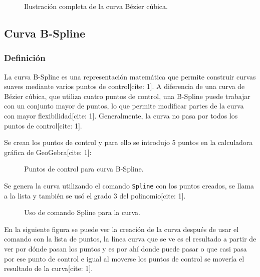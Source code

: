\documentclass[12pt,letterpaper]{article}
\begin{document}
\begin{figure}[H]
    \centering
    \caption{Ilustración completa de la curva Bézier cúbica.}
    \label{fig:curva_bezier_completa}
\end{figure}

\subsection{Curva B-Spline}

\subsubsection{Definición}
La curva B-Spline es una representación matemática que permite construir curvas suaves mediante varios puntos de control[cite: 1]. A diferencia de una curva de Bézier cúbica, que utiliza cuatro puntos de control, una B-Spline puede trabajar con un conjunto mayor de puntos, lo que permite modificar partes de la curva con mayor flexibilidad[cite: 1]. Generalmente, la curva no pasa por todos los puntos de control[cite: 1].

Se crean los puntos de control y para ello se introdujo 5 puntos en la calculadora gráfica de GeoGebra[cite: 1]:

\begin{figure}[H]
    \centering
    \caption{Puntos de control para curva B-Spline.}
    \label{fig:puntos_bspline}
\end{figure}

Se genera la curva utilizando el comando \texttt{Spline} con los puntos creados, se llama a la lista y también se usó el grado 3 del polinomio[cite: 1].

\begin{figure}[H]
    \centering
    \caption{Uso de comando Spline para la curva.}
    \label{fig:comando_spline}
\end{figure}

En la siguiente figura se puede ver la creación de la curva después de usar el comando con la lista de puntos, la línea curva que se ve es el resultado a partir de ver por dónde pasan los puntos y es por ahí donde puede pasar o que casi pasa por ese punto de control e igual al moverse los puntos de control se movería el resultado de la curva[cite: 1].
\end{document}
